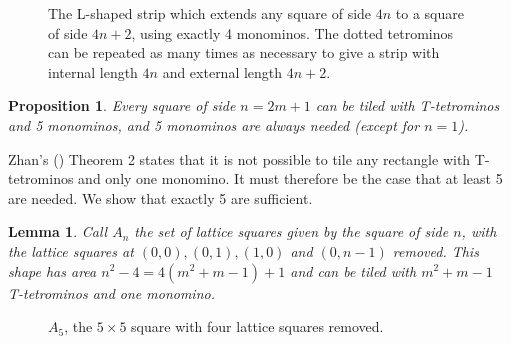\documentclass{article}
\theoremstyle{plain}
\newtheorem{proposition}[theorem]{Proposition}
\newtheorem{lemma}[theorem]{Lemma}
\begin{document}
\begin{figure}\label{lshaped}

\caption{The L-shaped strip which extends any square of side $4n$ to a square of side $4n+2$, using exactly 4 monominos. The dotted tetrominos can be repeated as many times as necessary to give a strip with internal length $4n$ and external length $4n + 2$.}
\end{figure}

\begin{proposition}\label{odd}
Every square of side $n = 2m + 1$ can be tiled with T-tetrominos and 5 monominos, and 5 monominos are always needed (except for $n = 1$).
\end{proposition}
Zhan's (\cite{zhan}) Theorem 2 states that it is not possible to tile any rectangle with T-tetrominos and only one monomino. It must therefore be the case that at least 5 are needed. We show that exactly 5 are sufficient.

\begin{lemma}
Call $A_n$ the set of lattice squares given by the square of side $n$, with the lattice squares at $(0, 0), (0,1), (1, 0)$ and $(0, n-1)$ removed. This shape has area $n^2 - 4 = 4(m^2 + m - 1) + 1$ and can be tiled with $m^2 + m - 1$ T-tetrominos and one monomino.
\end{lemma}

\begin{figure}\label{cropped}

\caption{$A_5$, the $5 \times 5$ square with four lattice squares removed.}
\end{figure}

{}

\end{document}
